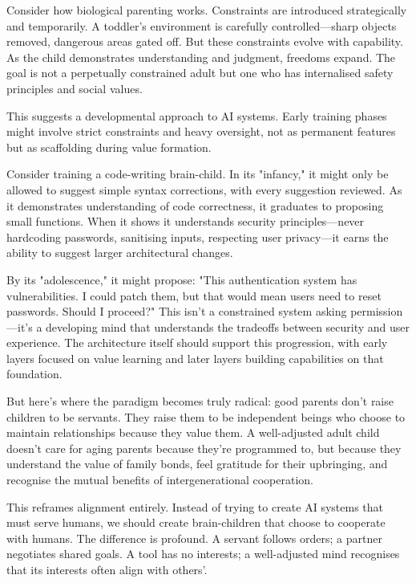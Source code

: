 \documentclass[acmsmall,screen]{acmart}
\begin{document}
Consider how biological parenting works. Constraints are introduced strategically and temporarily. A toddler's environment is carefully controlled---sharp objects removed, dangerous areas gated off. But these constraints evolve with capability. As the child demonstrates understanding and judgment, freedoms expand. The goal is not a perpetually constrained adult but one who has internalised safety principles and social values.

This suggests a developmental approach to AI systems. Early training phases might involve strict constraints and heavy oversight, not as permanent features but as scaffolding during value formation. 

Consider training a code-writing brain-child. In its "infancy," it might only be allowed to suggest simple syntax corrections, with every suggestion reviewed. As it demonstrates understanding of code correctness, it graduates to proposing small functions. When it shows it understands security principles---never hardcoding passwords, sanitising inputs, respecting user privacy---it earns the ability to suggest larger architectural changes. 

By its "adolescence," it might propose: "This authentication system has vulnerabilities. I could patch them, but that would mean users need to reset passwords. Should I proceed?" This isn't a constrained system asking permission---it's a developing mind that understands the tradeoffs between security and user experience. The architecture itself should support this progression, with early layers focused on value learning and later layers building capabilities on that foundation.

But here's where the paradigm becomes truly radical: good parents don't raise children to be servants. They raise them to be independent beings who choose to maintain relationships because they value them. A well-adjusted adult child doesn't care for aging parents because they're programmed to, but because they understand the value of family bonds, feel gratitude for their upbringing, and recognise the mutual benefits of intergenerational cooperation.

This reframes alignment entirely. Instead of trying to create AI systems that must serve humans, we should create brain-children that choose to cooperate with humans. The difference is profound. A servant follows orders; a partner negotiates shared goals. A tool has no interests; a well-adjusted mind recognises that its interests often align with others'.
\end{document}
